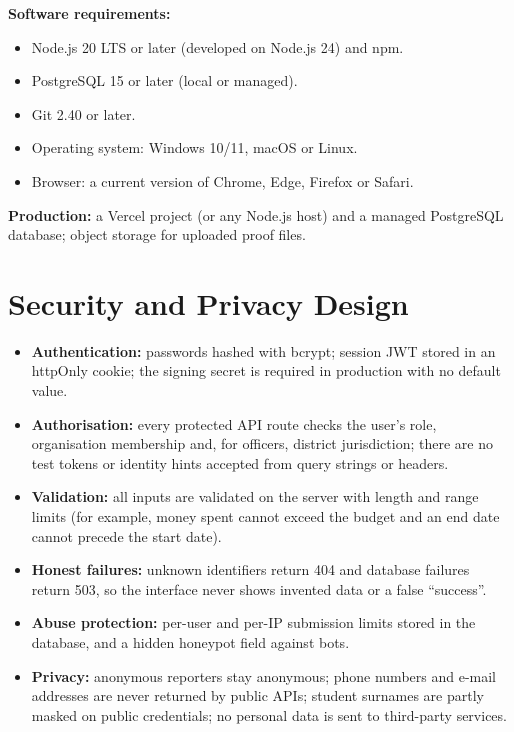 \textbf{Software requirements:}
\begin{itemize}
  \item Node.js 20 LTS or later (developed on Node.js 24) and npm.
  \item PostgreSQL 15 or later (local or managed).
  \item Git 2.40 or later.
  \item Operating system: Windows 10/11, macOS or Linux.
  \item Browser: a current version of Chrome, Edge, Firefox or Safari.
\end{itemize}

\textbf{Production:} a Vercel project (or any Node.js host) and a managed PostgreSQL database; object storage for uploaded proof files.

\section{Security and Privacy Design}
\begin{itemize}
  \item \textbf{Authentication:} passwords hashed with bcrypt; session JWT stored in an httpOnly cookie; the signing secret is required in production with no default value.
  \item \textbf{Authorisation:} every protected API route checks the user's role, organisation membership and, for officers, district jurisdiction; there are no test tokens or identity hints accepted from query strings or headers.
  \item \textbf{Validation:} all inputs are validated on the server with length and range limits (for example, money spent cannot exceed the budget and an end date cannot precede the start date).
  \item \textbf{Honest failures:} unknown identifiers return 404 and database failures return 503, so the interface never shows invented data or a false ``success''.
  \item \textbf{Abuse protection:} per-user and per-IP submission limits stored in the database, and a hidden honeypot field against bots.
  \item \textbf{Privacy:} anonymous reporters stay anonymous; phone numbers and e-mail addresses are never returned by public APIs; student surnames are partly masked on public credentials; no personal data is sent to third-party services.
\end{itemize}
